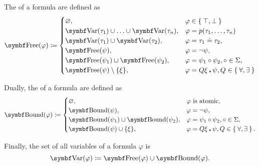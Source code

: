 \begin{definition}
\begin{DefEnum}
     The  of a formula are defined as
    \begin{equation}\label{eq:def:first_order_language/formula_free_variables}
      \Bold{Free}(\varphi) \coloneqq \begin{cases}
        \varnothing,                                            &\varphi \in \Set{ \top, \bot } \\
        \Bold{Var}(\tau_1) \cup \ldots \cup \Bold{Var}(\tau_n), &\varphi = p(\tau_1, \ldots, \tau_n) \\
        \Bold{Var}(\tau_1) \cup \Bold{Var}(\tau_2),             &\varphi = \tau_1 \doteq \tau_2, \\
        \Bold{Free}(\psi),                                      &\varphi = \neg \psi, \\
        \Bold{Free}(\psi_1) \cup \Bold{Free}(\psi_2),           &\varphi = \psi_1 \circ \psi_2, \circ \in \Sigma, \\
        \Bold{Free}(\psi) \setminus \{ \xi \},                  &\varphi = Q \xi \centerdot \psi, Q \in \Set{ \forall, \exists }
      \end{cases}
    \end{equation}

     Dually, the  of a formula are defined as
    \begin{equation}\label{eq:def:first_order_language/formula_bound_variables}
      \Bold{Bound}(\varphi) \coloneqq \begin{cases}
        \varnothing,                                    &\varphi \text{ is atomic}, \\
        \Bold{Bound}(\psi),                             &\varphi = \neg \psi, \\
        \Bold{Bound}(\psi_1) \cup \Bold{Bound}(\psi_2), &\varphi = \psi_1 \circ \psi_2, \circ \in \Sigma, \\
        \Bold{Bound}(\psi) \cup \{ \xi \},              &\varphi = Q \xi \centerdot \psi, Q \in \Set{ \forall, \exists }.
      \end{cases}
    \end{equation}

     Finally, the set of all variables of a formula \( \varphi \) is
    \begin{equation}\label{eq:def:first_order_language/formula_variables}
      \Bold{Var}(\varphi) \coloneqq \Bold{Free}(\varphi) \cup \Bold{Bound}(\varphi).
    \end{equation}
  \end{DefEnum}
\end{definition}


